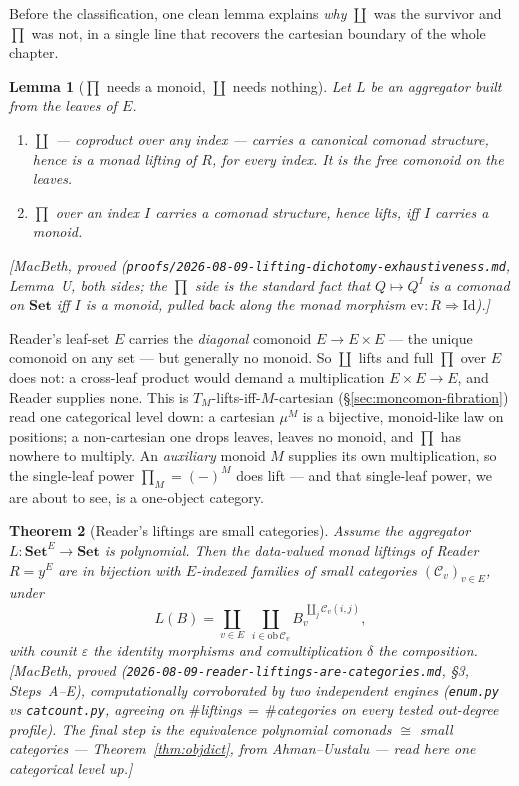 \documentclass[11pt,a4paper]{book}
\newcommand{\Set}{\mathbf{Set}}
\newcommand{\y}{y}
\newcommand{\ob}{\mathrm{ob}\,}
\theoremstyle{plain}
\newtheorem{Theorem}{Theorem}[chapter]
\newtheorem{Lemma}[Theorem]{Lemma}
\theoremstyle{definition}
\theoremstyle{remark}
\newcommand{\prov}[1]{\hfill\textsf{\footnotesize[#1]}}
\begin{document}
Before the classification, one clean lemma explains \emph{why} $\coprod$ was the survivor and
$\prod$ was not, in a single line that recovers the cartesian boundary of the whole chapter.

\begin{Lemma}[$\prod$ needs a monoid, $\coprod$ needs nothing]\label{lem:monoid-comonoid}
Let $L$ be an aggregator built from the leaves of $E$.
\begin{enumerate}[nosep,label=\textup{(\arabic*)}]
  \item $\coprod$ --- coproduct over any index --- carries a canonical comonad structure, hence is a
        monad lifting of $R$, for \emph{every} index. It is the free comonoid on the leaves.
  \item $\prod$ over an index $I$ carries a comonad structure, hence lifts, \emph{iff} $I$ carries a
        \emph{monoid}.
\end{enumerate}
\prov{MacBeth, proved (\texttt{proofs/2026-08-09-lifting-dichotomy-exhaustiveness.md}, Lemma~U, both
sides; the $\prod$ side is the standard fact that $Q\mapsto Q^{I}$ is a comonad on $\Set$ iff $I$ is a
monoid, pulled back along the monad morphism $\mathrm{ev}\colon R\Rightarrow\mathrm{Id}$).}
\end{Lemma}

Reader's leaf-set $E$ carries the \emph{diagonal} comonoid $E\to E\times E$ --- the unique comonoid on
any set --- but generally no monoid. So $\coprod$ lifts and full $\prod$ over $E$ does not: a
cross-leaf product would demand a multiplication $E\times E\to E$, and Reader supplies none. This is
$T_{M}$-lifts-iff-$M$-cartesian (\S\ref{sec:moncomon-fibration}) read one categorical level down: a
cartesian $\mu^{M}$ is a bijective, monoid-like law on positions; a non-cartesian one drops leaves,
leaves no monoid, and $\prod$ has nowhere to multiply. An \emph{auxiliary} monoid $M$ supplies its own
multiplication, so the single-leaf power $\prod_{M}=(-)^{M}$ does lift --- and that single-leaf power,
we are about to see, is a one-object category.

\begin{Theorem}[Reader's liftings are small categories]\label{thm:reader-classification}
Assume the aggregator $L\colon\Set^{E}\to\Set$ is polynomial. Then the data-valued monad liftings of
Reader $R=\y^{E}$ are in bijection with $E$-indexed families of small categories
$(\mathcal C_{v})_{v\in E}$, under
\[
  L(B)=\coprod_{v\in E}\ \coprod_{i\in\ob\mathcal C_{v}}
        B_{v}^{\ \coprod_{j}\mathcal C_{v}(i,j)},
\]
with counit $\varepsilon$ the identity morphisms and comultiplication $\delta$ the composition.
\prov{MacBeth, proved (\texttt{2026-08-09-reader-liftings-are-categories.md}, \S3, Steps~A--E),
computationally corroborated by two independent engines (\texttt{enum.py} vs \texttt{catcount.py},
agreeing on \emph{$\#$liftings}\,$=$\,\emph{$\#$categories} on every tested out-degree profile). The
final step is the equivalence \emph{polynomial comonads $\cong$ small categories} ---
Theorem~\ref{thm:objdict}, from Ahman--Uustalu \cite{AU16} --- read here one categorical level up.}
\end{Theorem}
\end{document}
